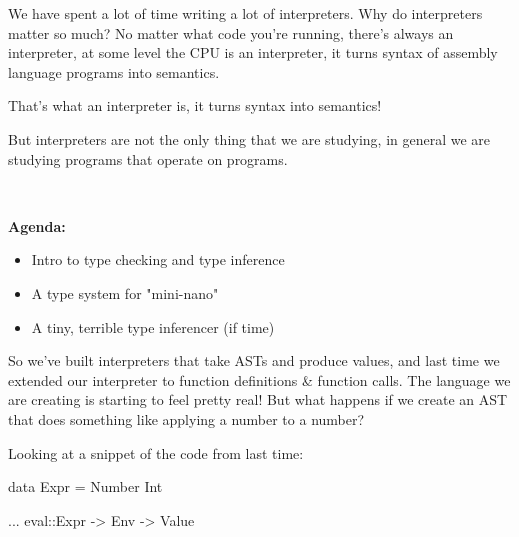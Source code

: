 \documentclass[11pt]{article}
\begin{document}
We have spent a lot of time writing a lot of interpreters. Why do interpreters matter so much? No matter what code you're running, there's always an interpreter, at some level the CPU is an interpreter, it turns syntax of assembly language programs into semantics.

That's what an interpreter is, it turns syntax into semantics!

But interpreters are not the only thing that we are studying, in general we are studying programs that operate on programs.

\

\noindent\textbf{Agenda:}
\begin{itemize}
    \item Intro to type checking and type inference
    \item A type system for "mini-nano"
    \item A tiny, terrible type inferencer (if time)
\end{itemize}


\noindent So we've built interpreters that take ASTs and produce values, and last time we extended our interpreter to function definitions \& function calls. The language we are creating is starting to feel pretty real! But what happens if we create an AST that does something like applying a number to a number? 

Looking at a snippet of the code from last time:

\begin{haskellcode}
data Expr = Number Int

...
eval::Expr -> Env -> Value


\end{haskellcode}
\end{document}
